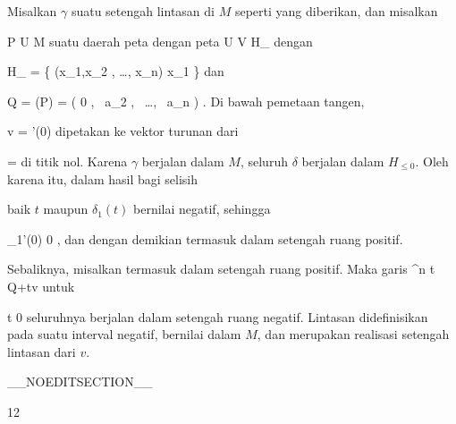 {

Misalkan $\gamma$ suatu setengah lintasan di $M$ seperti yang diberikan, dan misalkan

\mavergleichskette
{\vergleichskette
{ P
}
{ \in }{  U
}
{ \subseteq }{ M
}
{    }{
}
{   }{
}
}
{}{}{}
suatu daerah peta dengan peta
\maabbdisp {\alpha} { U } {V \subseteq  H_{}
} {}
dengan

\mavergleichskettedisp
{\vergleichskette
{  H_{}
}
{ =} { \left\{ (x_1,x_2 , \ldots, x_n)  \mid   x_1         \right\}
}
{ } {
}
{ } {
}
{ } {
}
}
{}{}{}
dan

\mavergleichskettedisp
{\vergleichskette
{ Q
}
{ =} { \alpha(P)
}
{ =} { \left(  0   , \,  a_2  , \,   \ldots , \,  a_n                \right)
}
{ } {
}
{ } {
}
}
{}{}{.}
Di bawah pemetaan tangen,

\mavergleichskette
{\vergleichskette
{ v
}
{ = }{ \gamma'(0)
}
{  }{
}
{    }{
}
{   }{
}
}
{}{}{}
dipetakan ke vektor turunan dari

\mavergleichskette
{\vergleichskette
{ \delta
}
{ = }{ \alpha \circ \gamma
}
{  }{
}
{    }{
}
{   }{
}
}
{}{}{}
di titik nol. Karena $\gamma$ berjalan dalam $M$, seluruh $\delta$ berjalan dalam $H_{\leq 0}$. Oleh karena itu, dalam hasil bagi selisih

 {  }

baik $t$ maupun $\delta_1(t)$ bernilai negatif, sehingga

\mavergleichskettedisp
{\vergleichskette
{  \delta_1'(0)
}
{ \geq} { 0
}
{ } {
}
{ } {
}
{ } {
}
}
{}{}{,}
dan dengan demikian termasuk dalam setengah ruang positif.

Sebaliknya, misalkan
 termasuk dalam setengah ruang positif. Maka garis
\maabbeledisp {\delta} {\R} {\R^n
} { t } { Q+tv
} {}
untuk

\mavergleichskette
{\vergleichskette
{ t
}
{ \leq }{  0
}
{  }{
}
{    }{
}
{   }{
}
}
{}{}{}
seluruhnya berjalan dalam setengah ruang negatif. Lintasan
 didefinisikan pada suatu interval negatif, bernilai dalam $M$, dan merupakan realisasi setengah lintasan dari $v$.

}

__NOEDITSECTION__

{12}

